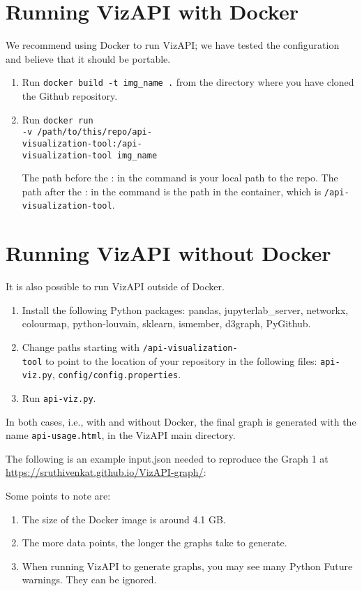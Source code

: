 \section{Running VizAPI with Docker}
We recommend using Docker to run VizAPI; we have tested the configuration and believe that it should be portable.
\begin{enumerate}
\item Run \texttt{docker build -t img\_name .} 
from the directory where you have cloned the Github repository.
\item Run \texttt{docker run \\\hspace*{1em} -v /path/to/this/repo/api-\\\hspace*{1em} visualization-tool:/api-\\ \hspace*{1em} visualization-tool img\_name} 

The path before the : in the command is your local path to the repo. The path after the : in the command is the path in the container, which is \texttt{/api-visualization-tool}.
\end{enumerate}

\section{Running VizAPI without Docker}
It is also possible to run VizAPI outside of Docker.
\begin{enumerate}
\item Install the following Python packages: pandas, jupyterlab\_server, networkx, colourmap, python-louvain, sklearn, ismember, d3graph, PyGithub.
\item Change paths starting with \texttt{/api-visualization-\\tool} to point to the location of your repository in the following files: \texttt{api-viz.py}, \texttt{config/config.properties}.
\item Run \texttt{api-viz.py}.
\end{enumerate}

In both cases, i.e., with and without Docker, the final graph is generated with the name \texttt{api-usage.html}, in the VizAPI 
main directory.

The following is an example input.json needed to reproduce the Graph 1 at \href{https://sruthivenkat.github.io/VizAPI-graph/}{https://sruthivenkat.github.io/VizAPI-graph/}:


Some points to note are:
\begin{enumerate}
\item The size of the Docker image is around 4.1 GB.
\item The more data points, the longer the graphs take to generate.
\item When running VizAPI to generate graphs, you may see many Python Future warnings. They can be ignored.
\end{enumerate}